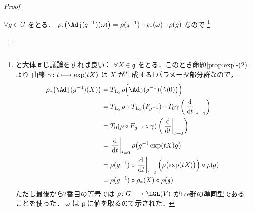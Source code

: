 \documentclass[geometry_main]{subfiles}
\begin{document}
\begin{proof}
\begin{enumerate}
\begin{description}
            $\forall g \in G$ をとる．
            $\rho_* \bigl( \Adj(g^{-1})(\omega) \bigr) = \rho(g^{-1}) \circ \rho_*(\omega) \circ \rho(g)$ なので
            \footnote{
                と大体同じ議論をすれば良い：
                $\forall X \in \mathfrak{g}$ をとる．このとき命題\ref{prop:exp}-(2) より \cinfty 曲線 $\gamma \colon t \longmapsto \exp(tX)$ は $X$ が生成する1パラメータ部分群なので，
                \begin{align}
                    \rho_* \bigl(\Adj(g^{-1})(X)  \bigr)
                    &= T_{1_G} \rho \Bigl(\Adj(g^{-1})\bigl(\dot{\gamma}(0)\bigr) \Bigr)   \\
                    &= T_{1_G} \rho \circ T_{1_G}(F_{g^{-1}}) \circ T_0 \gamma \left( \eval{\dv{}{t}}_{t=0} \right)  \\
                    &= T_{0}(\rho \circ F_{g^{-1}} \circ \gamma) \left( \eval{\dv{}{t}}_{t=0} \right) \\
                    &= \eval{\dv{}{t}}_{t=0} \rho\bigl(g^{-1} \exp(tX) g\bigr) \\
                    &= \rho(g^{-1}) \circ \eval{\dv{}{t}}_{t=0}\Bigl(\rho\bigl(\exp(tX)\bigr) \Bigr) \circ \rho(g) \\
                    &= \rho(g^{-1}) \circ \rho_*(X) \circ \rho(g)
                \end{align}
                ただし最後から2番目の等号では $\rho \colon G \lto \LGL (V)$ がLie群の準同型であることを使った．
                $\omega$ は $\mathfrak{g}$ に値を取るので示された．
            }
                

\end{description}
\end{enumerate}
\end{proof}
\end{document}
